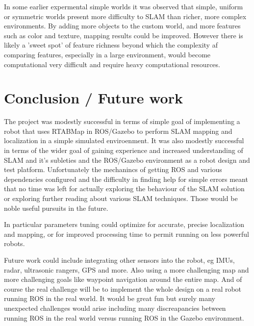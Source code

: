 \documentclass[10pt,journal,compsoc]{IEEEtran}
\begin{document}
In some earlier expermental simple worlds it was observed that simple, uniform or symmetric worlds present more difficulty to SLAM than richer, more complex environments. By adding more objects to the custom world, and more features such as color and texture, mapping results could be improved. However there is likely a 'sweet spot' of feature richness beyond which the complexity af comparing features, especially in a large environment, would become computational very difficult and require heavy computational resources.

\section{Conclusion / Future work}
The project was modestly successful in terms of simple goal of implementing a robot that uses RTABMap in ROS/Gazebo to perform SLAM mapping and localization in a simple simulated enviroenment. It was also modestly successful in terms of the wider goal of gaining experience and increased understanding of SLAM and it's subleties and the ROS/Gazebo environment as a robot design and test platform. Unfortunately the mechanincs of getting ROS and various dependencies configured and the difficulty in finding help for simple errors meant that no time was left for actually exploring the behaviour of the SLAM solution or exploring further reading about various SLAM techniques. Those would be noble useful pursuits in the future.

In particular parameters tuning could optimize for accurate, precise localization and mapping, or for improved processing time to permit running on less powerful robots. 

Future work could include integrating other sensors into the robot, eg IMUs, radar, ultrasonic rangers, GPS and more. Also using a more challenging map and more challenging goals like waypoint navigation around the entire map. And of course the real challenge will be to implement the whole design on a real robot running ROS in the real world. It would be great fun but surely many unexpected challenges would arise including many discreapancies between running ROS in the real world versus running ROS in the Gazebo environment. 
\end{document}
